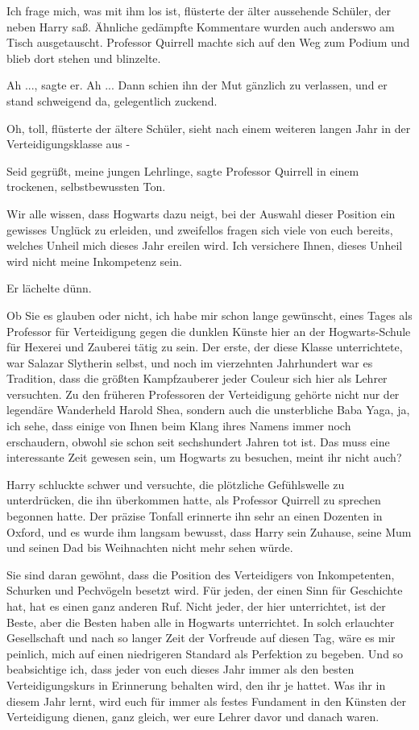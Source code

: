 \glqq{}Ich frage mich, was mit ihm los ist\grqq{}, flüsterte der älter
aussehende Schüler, der neben Harry saß. Ähnliche gedämpfte Kommentare wurden
auch anderswo am Tisch ausgetauscht. Professor Quirrell machte sich auf den Weg
zum Podium und blieb dort stehen und blinzelte.

\glqq{}Ah ...\grqq{}, sagte er. \glqq{}Ah ...\grqq{} Dann schien ihn der Mut
gänzlich zu verlassen, und er stand schweigend da, gelegentlich zuckend.

\glqq{}Oh, toll\grqq{}, flüsterte der ältere Schüler, \glqq{}sieht nach einem
weiteren langen Jahr in der Verteidigungsklasse aus -\grqq{}

\glqq{}Seid gegrüßt, meine jungen Lehrlinge\grqq{}, sagte Professor Quirrell in
einem trockenen, selbstbewussten Ton.

\glqq{}Wir alle wissen, dass Hogwarts dazu neigt, bei der Auswahl dieser
Position ein gewisses Unglück zu erleiden, und zweifellos fragen sich viele von
euch bereits, welches Unheil mich dieses Jahr ereilen wird. Ich versichere
Ihnen, dieses Unheil wird nicht meine Inkompetenz sein.\grqq{}

Er lächelte dünn.

\glqq{}Ob Sie es glauben oder nicht, ich habe mir schon lange gewünscht, eines
Tages als Professor für Verteidigung gegen die dunklen Künste hier an der
Hogwarts-Schule für Hexerei und Zauberei tätig zu sein. Der erste, der diese
Klasse unterrichtete, war Salazar Slytherin selbst, und noch im vierzehnten
Jahrhundert war es Tradition, dass die größten Kampfzauberer jeder Couleur sich
hier als Lehrer versuchten. Zu den früheren Professoren der Verteidigung gehörte
nicht nur der legendäre Wanderheld Harold Shea, sondern auch die unsterbliche
Baba Yaga, ja, ich sehe, dass einige von Ihnen beim Klang ihres Namens immer
noch erschaudern, obwohl sie schon seit sechshundert Jahren tot ist. Das muss
eine interessante Zeit gewesen sein, um Hogwarts zu besuchen, meint ihr nicht
auch?\grqq{}

Harry schluckte schwer und versuchte, die plötzliche Gefühlswelle zu
unterdrücken, die ihn überkommen hatte, als Professor Quirrell zu sprechen
begonnen hatte. Der präzise Tonfall erinnerte ihn sehr an einen Dozenten in
Oxford, und es wurde ihm langsam bewusst, dass Harry sein Zuhause, seine Mum und
seinen Dad bis Weihnachten nicht mehr sehen würde.

\glqq{}Sie sind daran gewöhnt, dass die Position des Verteidigers von
Inkompetenten, Schurken und Pechvögeln besetzt wird. Für jeden, der einen Sinn
für Geschichte hat, hat es einen ganz anderen Ruf. Nicht jeder, der hier
unterrichtet, ist der Beste, aber die Besten haben alle in Hogwarts
unterrichtet. In solch erlauchter Gesellschaft und nach so langer Zeit der
Vorfreude auf diesen Tag, wäre es mir peinlich, mich auf einen niedrigeren
Standard als Perfektion zu begeben. Und so beabsichtige ich, dass jeder von euch
dieses Jahr immer als den besten Verteidigungskurs in Erinnerung behalten wird,
den ihr je hattet. Was ihr in diesem Jahr lernt, wird euch für immer als festes
Fundament in den Künsten der Verteidigung dienen, ganz gleich, wer eure Lehrer
davor und danach waren.\grqq{}


